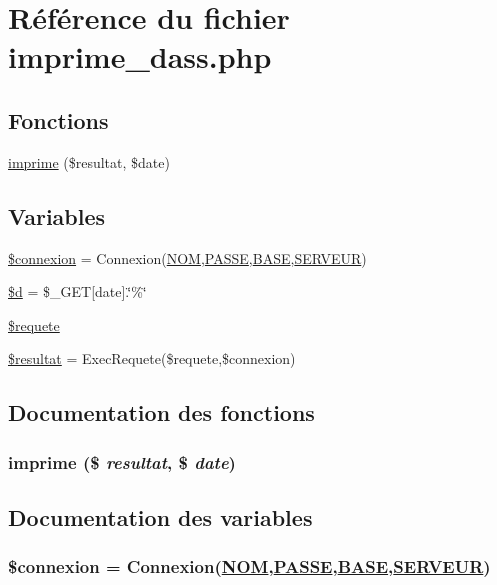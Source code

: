 \hypertarget{imprime__dass_8php}{
\section{R\'{e}f\'{e}rence du fichier imprime\_\-dass.php}
\label{imprime__dass_8php}
}
\subsection*{Fonctions}
\begin{CompactItemize}
\item 
\hyperlink{imprime__dass_8php_a4}{imprime} (\$resultat, \$date)
\end{CompactItemize}
\subsection*{Variables}
\begin{CompactItemize}
\item 
\hyperlink{imprime__dass_8php_a0}{\$connexion} = Connexion(\hyperlink{pma__connect_8php_a0}{NOM},\hyperlink{pma__connect_8php_a1}{PASSE},\hyperlink{pma__connect_8php_a3}{BASE},\hyperlink{pma__connect_8php_a2}{SERVEUR})
\item 
\hyperlink{imprime__dass_8php_a1}{\$d} = \$\_\-GET\mbox{[}date\mbox{]}.\char`\"{}\%\char`\"{}
\item 
\hyperlink{imprime__dass_8php_a2}{\$requete}
\item 
\hyperlink{imprime__dass_8php_a3}{\$resultat} = Exec\-Requete(\$requete,\$connexion)
\end{CompactItemize}


\subsection{Documentation des fonctions}
\hypertarget{imprime__dass_8php_a4}{
\subsubsection[imprime]{\setlength{\rightskip}{0pt plus 5cm}imprime (\$ {\em resultat}, \$ {\em date})}}
\label{imprime__dass_8php_a4}




\subsection{Documentation des variables}
\hypertarget{imprime__dass_8php_a0}{
\subsubsection[\$connexion]{\setlength{\rightskip}{0pt plus 5cm}\$connexion = Connexion(\hyperlink{pma__connect_8php_a0}{NOM},\hyperlink{pma__connect_8php_a1}{PASSE},\hyperlink{pma__connect_8php_a3}{BASE},\hyperlink{pma__connect_8php_a2}{SERVEUR})}}
\label{imprime__dass_8php_a0}


